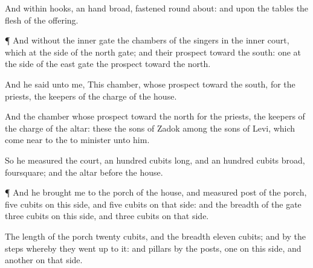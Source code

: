 {And
within
{}
hooks,
an
hand broad,
fastened round
about: and upon the
tables
{} the
flesh of the
offering.


\par }{\PP {}¶ And
without the
inner
gate
{} the
chambers of the
singers in the
inner
court, which
{} at the
side of the
north
gate; and their
prospect
{}
toward the
south:
one at the
side of the
east
gate
{} the
prospect
toward the
north.

And he
said unto me,
This
chamber, whose
prospect
{}
toward the
south,
{} for the
priests, the
keepers of the
charge of the
house.

And the
chamber whose
prospect
{}
toward the
north
{} for the
priests, the
keepers of the
charge of the
altar: these
{} the
sons of
Zadok among the
sons of
Levi, which come
near to the
{} to
minister unto him.

So he
measured the
court, an
hundred
cubits
long, and an
hundred
cubits
broad,
foursquare; and the
altar
{}
before the
house.


\par }{\PP {}¶ And he
brought me to the
porch of the
house, and
measured
{}
post of the
porch,
five
cubits on this side, and
five
cubits on that side: and the
breadth of the
gate
{}
three
cubits on this side, and
three
cubits on that side.

The
length of the
porch
{}
twenty
cubits, and the
breadth
eleven
cubits; and
{} by the
steps whereby they went
up to it: and
{}
pillars by the
posts,
one on this side, and
another on that side.




\par }
